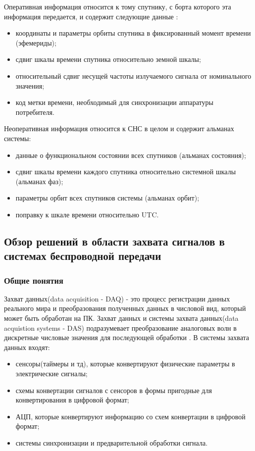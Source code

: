 Оперативная информация относится к тому спутнику, с борта которого эта информация передается, и содержит следующие данные
\cite{yacenkov, tsui}:
\begin{itemize}
\item координаты и параметры орбиты спутника в фиксированный момент времени (эфемериды);
\item сдвиг шкалы времени спутника относительно земной шкалы;
\item относительный сдвиг несущей частоты излучаемого сигнала от номинального значения;
\item код метки времени, необходимый для синхронизации аппаратуры потребителя.
\end{itemize}

Неоперативная информация относится к СНС в целом и содержит альманах системы:
\begin{itemize}
\item данные о функциональном состоянии всех спутников (альманах состояния);
\item сдвиг шкалы времени каждого спутника относительно системной шкалы (альманах фаз);
\item параметры орбит всех спутников системы (альманах орбит);
\item поправку к шкале времени относительно UTC.
\end{itemize}


\subsection{Обзор решений в области захвата сигналов в системах беспроводной передачи}
\label{razdel12}
\subsubsection{Общие понятия}
Захват данных(data acquisition - DAQ) - это процесс регистрации данных реального мира и преобразования полученных данных в 
числовой вид, который может быть обработан на ПК. Захват данных и системы захвата данных(data acquistion systems - DAS) подразумевает
преобразование аналоговых волн в дискретные числовые значения для последующей обработки \cite{ni_acq}. В системы захвата данных входят:

\begin{itemize}
\item сенсоры(таймеры и тд), которые конвертируют физические параметры в электрические сигналы;
\item схемы конвертации сигналов с сенсоров в формы пригодные для конвертирования в цифровой формат;
\item АЦП, которые конвертируют информацию со схем конвертации в цифровой формат;
\item системы синхронизации и предварительной обработки сигнала.
\end{itemize}

